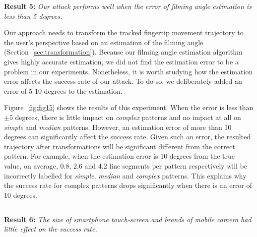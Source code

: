    \noindent \textbf{Result 5:} \emph{Our attack performs well when the error of filming angle estimation is less than 5 degrees.}

   Our approach needs to transform the tracked fingertip movement trajectory to the
   user's perspective based on an estimation of the filming angle
   (Section~\ref{sec:transformation}).
   Because our filming angle estimation
    algorithm gives highly accurate estimation, we did not find the estimation error to be a problem in our experiments.
   Nonetheless, it is worth studying how the estimation error affects the success rate of our attack. To do so, we deliberately added an error of 5-10 degrees to the estimation.

    Figure~\ref{fig:fig15} shows the results of this experiment. When the error is less than $\pm 5$ degrees, there is little impact
    on \emph{complex} patterns and no impact at all on \emph{simple} and
    \emph{median} patterns. However, an estimation error of more than 10 degrees can significantly affect the success rate.
    Given such an error, the resulted trajectory after transformations will
    be significant different from the correct pattern.
    For example, when the estimation error is 10 degrees from the
    true value,  on average, 0.8, 2.6 and 4.2 line segments per pattern respectively will
    be incorrectly labelled for \emph{simple}, \emph{median} and
    \emph{complex} patterns. This explains why the success rate for complex patterns drops significantly when there is
    an error of 10 degrees.

    \subsection{}
    \noindent \textbf{Result 6:} \emph{The size of smartphone touch-screen and brands of mobile camera had little effect on the success rate.}

